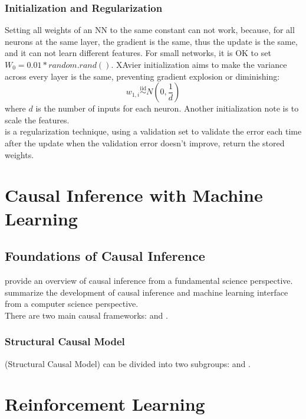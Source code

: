 \documentclass[12pt]{report}
\begin{document}
\subsubsection{Initialization and Regularization}
Setting all weights of an NN to the same constant can not work, because, for all neurons at the same layer, the gradient is the same, thus the update is the same, and it can not 
learn different features. For small networks, it is OK to set $W_0=0.01*random.rand()$. XAvier initialization aims to make the variance across every layer is the same, 
preventing gradient explosion or diminishing:
\[w_{1,i}\overset{\mathrm{iid}}{\operatorname*{\sim}}N\left(0,\frac1d\right)\]
where $d$ is the number of inputs for each neuron. Another initialization note is to scale the features.\\
 is a regularization technique, using a validation set to validate the error each time after the update when the validation error 
doesn't improve, return the stored weights.

\clearpage
\section{Causal Inference with Machine Learning}

\subsection{Foundations of Causal Inference}

\cite{peters2017elements} provide an overview of causal inference from a fundamental science perspective. \cite{spirtes2010introduction}
summarize the development of causal inference and machine learning interface from a computer science perspective.\\
There are two main causal frameworks:  and .

\subsubsection{Structural Causal Model}
 (Structural Causal Model) can be divided into two subgroups:  and .

\clearpage
\section{Reinforcement Learning}
\end{document}
